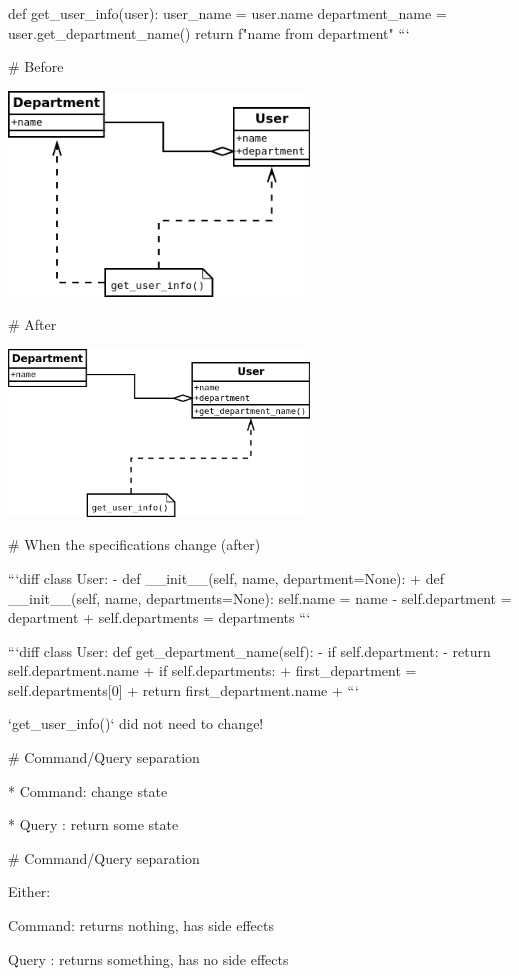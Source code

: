 def get_user_info(user):
    user_name = user.name
    department_name = user.get_department_name()
    return f"{name} from {department}"
```

# Before

\includegraphics[width=8cm]{demeter-1.png}

# After

\includegraphics[width=8cm]{demeter-2.png}

# When the specifications change (after)


```diff
class User:
- def __init__(self, name, department=None):
+ def __init__(self, name, departments=None):
        self.name = name
-        self.department = department
+        self.departments = departments
```

```diff
class User:
   def get_department_name(self):
-       if self.department:
-           return self.department.name
+       if self.departments:
+           first_department = self.departments[0]
+           return first_department.name
+
```

`get_user_info()` did not need to change!

# Command/Query separation

* Command: change state

* Query : return some state

# Command/Query separation

Either:

Command: returns nothing, has side effects

Query : returns something, has no side effects

